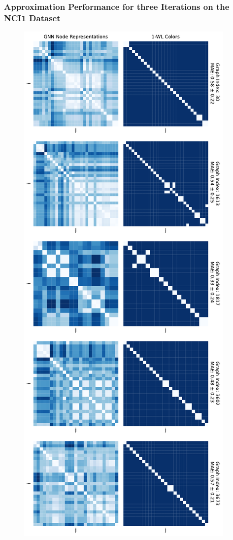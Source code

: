 \subsubsection{\gnn Approximation Performance for three \wl Iterations on the NCI1 Dataset}
\begin{figure}[H]
    \centering
    \begin{minipage}[b]{0.45992852703\textwidth}
        \centering
        \includegraphics[width=\textwidth, left]{Figures/heatmaps_NCI1_0.pdf}

\end{minipage}
\end{figure}

